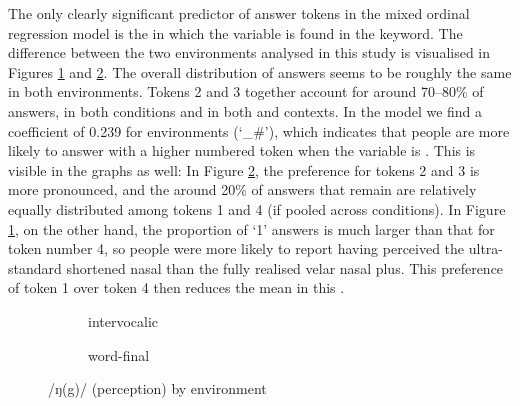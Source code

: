 The only clearly significant predictor of answer tokens in the mixed ordinal regression model is the  in which the variable is found in the keyword.
The difference between the two environments analysed in this study is visualised in Figures \ref{fig.bar.ng.ext.intervoc} and \ref{fig.bar.ng.ext.wordfinal}.
The overall distribution of answers seems to be roughly the same in both environments.
Tokens 2 and 3 together account for around 70--80\% of answers, in both  conditions and in both  and  contexts.
In the model we find a coefficient of 0.239 for  environments (`\_\#'), which indicates that people are more likely to answer with a higher numbered token when the variable is .
This is visible in the graphs as well: In Figure \ref{fig.bar.ng.ext.wordfinal}, the preference for tokens 2 and 3 is more pronounced, and the around 20\% of answers that remain are relatively equally distributed among tokens 1 and 4 (if pooled across  conditions).
In Figure \ref{fig.bar.ng.ext.intervoc}, on the other hand, the proportion of `1' answers is much larger than that for token number 4, so people were more likely to report having perceived the ultra-standard shortened nasal than the fully realised  velar nasal plus.
This preference of token 1 over token 4 then reduces the mean in this .

\begin{figure}[h]
	\centering
	\begin{subfigure}{0.49\textwidth}
		\centering
			\resizebox{\linewidth}{!}{}
		\caption{intervocalic}
		\label{fig.bar.ng.ext.intervoc}
	\end{subfigure}
	\begin{subfigure}{0.49\textwidth}
		\centering
			\resizebox{\linewidth}{!}{} 
		\caption{word-final}
		\label{fig.bar.ng.ext.wordfinal}
	\end{subfigure}
	\caption{/ŋ(g)/ (perception) by environment}
	\label{fig.bar.ng.ext.environment}
\end{figure}

